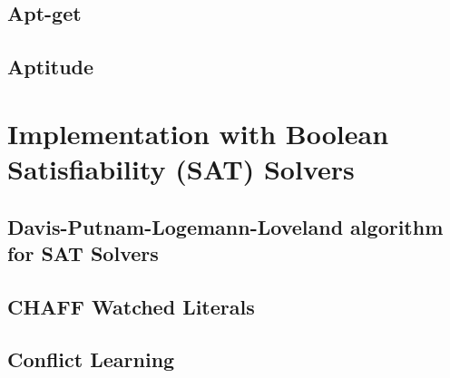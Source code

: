 \subsection{Apt-get}

\subsection{Aptitude}

\section{Implementation with Boolean Satisfiability (SAT) Solvers}





\subsection{Davis-Putnam-Logemann-Loveland algorithm for SAT Solvers}


\subsection{CHAFF Watched Literals}

\subsection{Conflict Learning}

